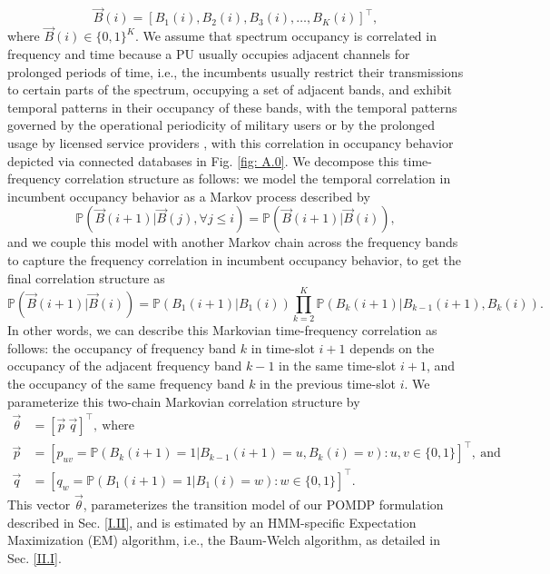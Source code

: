\documentclass[12pt, draftcls, onecolumn]{IEEEtran}
\begin{document}
\begin{equation}\label{4}
    \vec{B}(i)=[B_{1}(i),B_{2}(i),B_{3}(i),\dots,B_{K}(i)]^{\intercal},
\end{equation}
where $\vec{B}(i){\in}\{0,1\}^{K}$.
We assume that spectrum occupancy is correlated in frequency and time because a PU usually occupies adjacent channels for prolonged periods of time, i.e., the incumbents usually restrict their transmissions to certain parts of the spectrum, occupying a set of adjacent bands, and exhibit temporal patterns in their occupancy of these bands, with the temporal patterns governed by the operational periodicity of military users or by the prolonged usage by licensed service providers \cite{WCL:12}, with this correlation in occupancy behavior depicted via connected databases in Fig. \ref{fig: A.0}. We decompose this time-frequency correlation structure as follows: we model the temporal correlation in incumbent occupancy behavior as a Markov process described by
\begin{equation}\label{5}
    \mathbb{P}(\vec{B}(i+1)|\vec{B}(j),\forall j \leq i)=\mathbb{P}(\vec{B}(i+1)|\vec{B}(i)),
\end{equation}
and we couple this model with another Markov chain across the frequency bands to capture the frequency correlation in incumbent occupancy behavior, to get the final correlation structure as
\begin{equation}\label{6}
    \mathbb{P}(\vec{B}(i+1)|\vec{B}(i))=\mathbb{P}(B_{1}(i+1)|B_{1}(i))\prod_{k=2}^{K}\mathbb{P}(B_{k}(i+1)|B_{k-1}(i+1),B_{k}(i)).
\end{equation}
In other words, we can describe this Markovian time-frequency correlation as follows: the occupancy of frequency band $k$ in time-slot $i+1$ depends on the occupancy of the adjacent frequency band $k-1$ in the same time-slot $i+1$, and the occupancy of the same frequency band $k$ in the previous time-slot $i$. We parameterize this two-chain Markovian correlation structure by
\begin{equation}\label{7}
    \begin{aligned}
        \vec{\theta}&=[\vec{p}\ \vec{q}]^{\intercal},\ \text{where}\\
        \vec{p}&=[p_{uv}=\mathbb{P}(B_{k}(i+1)=1|B_{k-1}(i+1)=u,B_{k}(i)=v):u,v \in \{0,1\}]^{\intercal},\ \text{and}\\
        \vec{q}&=[q_{w}=\mathbb{P}(B_{1}(i+1)=1|B_{1}(i)=w):w \in \{0,1\}]^{\intercal}.
    \end{aligned}
\end{equation}
This vector $\vec{\theta}$, parameterizes the transition model of our POMDP formulation described in Sec. \ref{I.II}, and is estimated by an HMM-specific Expectation Maximization (EM) algorithm, i.e., the Baum-Welch algorithm, as detailed in Sec. \ref{II.I}.
\end{document}
